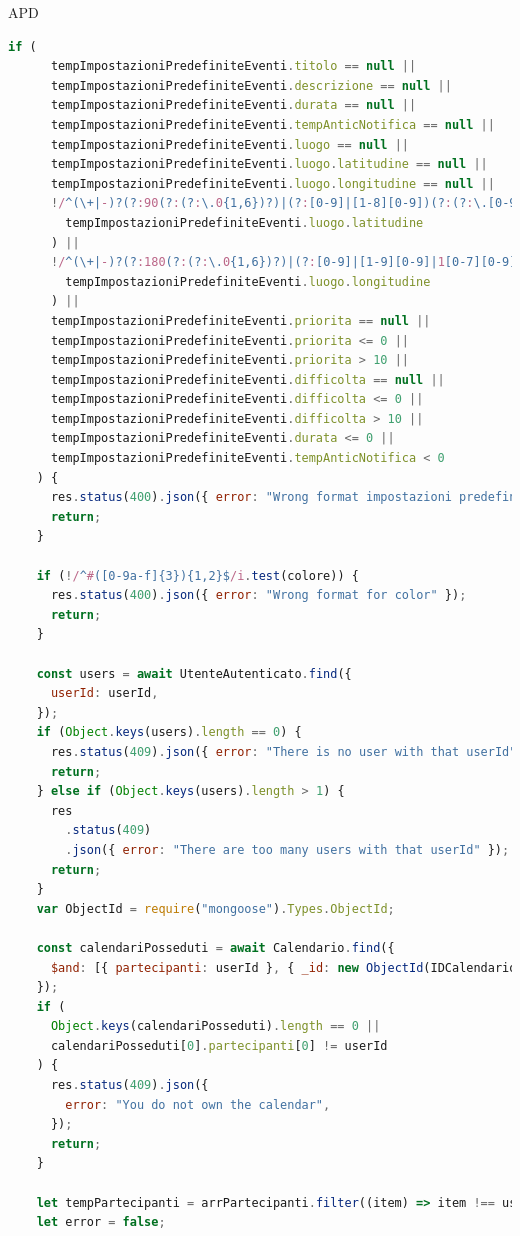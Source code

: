 \begin{listaPersonale} {APD}
\begin{listaPersonale2}[APD]{}
\begin{lstlisting}[language=JavaScript]
    if (
      tempImpostazioniPredefiniteEventi.titolo == null ||
      tempImpostazioniPredefiniteEventi.descrizione == null ||
      tempImpostazioniPredefiniteEventi.durata == null ||
      tempImpostazioniPredefiniteEventi.tempAnticNotifica == null ||
      tempImpostazioniPredefiniteEventi.luogo == null ||
      tempImpostazioniPredefiniteEventi.luogo.latitudine == null ||
      tempImpostazioniPredefiniteEventi.luogo.longitudine == null ||
      !/^(\+|-)?(?:90(?:(?:\.0{1,6})?)|(?:[0-9]|[1-8][0-9])(?:(?:\.[0-9]{1,6})?))$/.test(
        tempImpostazioniPredefiniteEventi.luogo.latitudine
      ) ||
      !/^(\+|-)?(?:180(?:(?:\.0{1,6})?)|(?:[0-9]|[1-9][0-9]|1[0-7][0-9])(?:(?:\.[0-9]{1,6})?))$/.test(
        tempImpostazioniPredefiniteEventi.luogo.longitudine
      ) ||
      tempImpostazioniPredefiniteEventi.priorita == null ||
      tempImpostazioniPredefiniteEventi.priorita <= 0 ||
      tempImpostazioniPredefiniteEventi.priorita > 10 ||
      tempImpostazioniPredefiniteEventi.difficolta == null ||
      tempImpostazioniPredefiniteEventi.difficolta <= 0 ||
      tempImpostazioniPredefiniteEventi.difficolta > 10 ||
      tempImpostazioniPredefiniteEventi.durata <= 0 ||
      tempImpostazioniPredefiniteEventi.tempAnticNotifica < 0
    ) {
      res.status(400).json({ error: "Wrong format impostazioni predefinite" });
      return;
    }

    if (!/^#([0-9a-f]{3}){1,2}$/i.test(colore)) {
      res.status(400).json({ error: "Wrong format for color" });
      return;
    }

    const users = await UtenteAutenticato.find({
      userId: userId,
    });
    if (Object.keys(users).length == 0) {
      res.status(409).json({ error: "There is no user with that userId" });
      return;
    } else if (Object.keys(users).length > 1) {
      res
        .status(409)
        .json({ error: "There are too many users with that userId" });
      return;
    }
    var ObjectId = require("mongoose").Types.ObjectId;

    const calendariPosseduti = await Calendario.find({
      $and: [{ partecipanti: userId }, { _id: new ObjectId(IDCalendario) }],
    });
    if (
      Object.keys(calendariPosseduti).length == 0 ||
      calendariPosseduti[0].partecipanti[0] != userId
    ) {
      res.status(409).json({
        error: "You do not own the calendar",
      });
      return;
    }

    let tempPartecipanti = arrPartecipanti.filter((item) => item !== userId);
    let error = false;


\end{lstlisting}
\end{listaPersonale2}
\end{listaPersonale}
